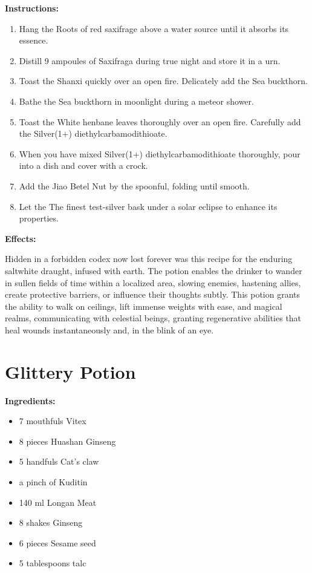 \documentclass{article}
\begin{document}
\textbf{Instructions:}

\begin{enumerate}
  \item Hang the Roots of red saxifrage above a water source until it absorbs its essence.
  \item Distill 9 ampoules of Saxifraga during true night and store it in a urn.
  \item Toast the Shanxi quickly over an open fire. Delicately add the Sea buckthorn.
  \item Bathe the Sea buckthorn in moonlight during a meteor shower.
  \item Toast the White henbane leaves thoroughly over an open fire. Carefully add the Silver(1+) diethylcarbamodithioate.
  \item When you have mixed Silver(1+) diethylcarbamodithioate thoroughly, pour into a dish and cover with a crock.
  \item Add the Jiao Betel Nut by the spoonful, folding until smooth.
  \item Let the The finest test-silver bask under a solar eclipse to enhance its properties.
\end{enumerate}

\textbf{Effects:}

Hidden in a forbidden codex now lost forever was this recipe for the enduring saltwhite draught, infused with earth. The potion enables the drinker to wander in sullen fields of time within a localized area, slowing enemies, hastening allies, create protective barriers, or influence their thoughts subtly. This potion grants the ability to walk on ceilings, lift immense weights with ease, and magical realms, communicating with celestial beings, granting regenerative abilities that heal wounds instantaneously and, in the blink of an eye.

\newpage
\section*{Glittery Potion}

\textbf{Ingredients:}

\begin{itemize}
  \item 7 mouthfuls Vitex
  \item 8 pieces Huashan Ginseng
  \item 5 handfuls Cat's claw
  \item a pinch of Kuditin
  \item 140 ml Longan Meat
  \item 8 shakes Ginseng
  \item 6 pieces Sesame seed
  \item 5 tablespoons talc
\end{itemize}
\end{document}
